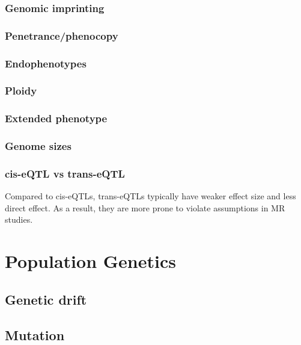\documentclass[]{book}
\theoremstyle{definition}
\theoremstyle{definition}
\theoremstyle{definition}
\theoremstyle{remark}
\begin{document}
\section{Genomic imprinting}\label{genomic-imprinting}

\section{Penetrance/phenocopy}\label{penetrancephenocopy}

\section{Endophenotypes}\label{endophenotypes}

\section{Ploidy}\label{ploidy}

\section{Extended phenotype}\label{extended-phenotype}

\section{Genome sizes}\label{genome-sizes}

\section{cis-eQTL vs trans-eQTL}\label{cis-eqtl-vs-trans-eqtl}

Compared to cis-eQTLs, trans-eQTLs typically have weaker effect size and
less direct effect. As a result, they are more prone to violate
assumptions in MR studies.

\part{Population Genetics}\label{part-population-genetics}

\chapter{Genetic drift}\label{genetic-drift}

\chapter{Mutation}\label{mutation}
\end{document}
